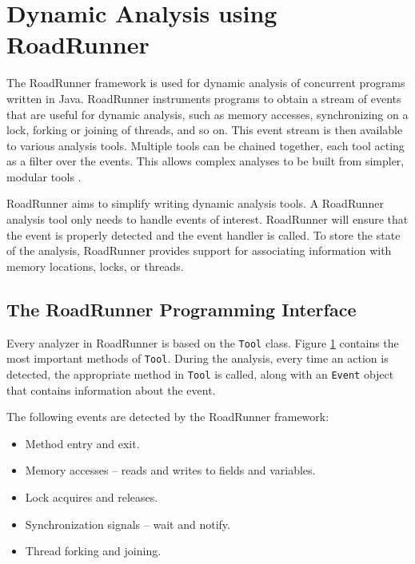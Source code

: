 \section{Dynamic Analysis using RoadRunner}

The RoadRunner framework is used for dynamic analysis of concurrent programs
written in Java. RoadRunner instruments programs to obtain a stream of events
that are useful for dynamic analysis, such as memory accesses, synchronizing on
a lock, forking or joining of threads, and so on. This event stream is then
available to various analysis tools. Multiple tools can be chained together,
each tool acting as a filter over the events. This allows complex analyses to be
built from simpler, modular tools \cite{RoadRunner}.

RoadRunner aims to simplify writing dynamic analysis tools. A RoadRunner
analysis tool only needs to handle events of interest. RoadRunner will ensure
that the event is properly detected and the event handler is called. To store
the state of the analysis, RoadRunner provides support for associating
information with memory locations, locks, or threads.



\subsection{The RoadRunner Programming Interface}

Every analyzer in RoadRunner is based on the \texttt{Tool} class. Figure
\ref{toolclass} contains the most important methods of \texttt{Tool}. During the
analysis, every time an action is detected, the appropriate method in
\texttt{Tool} is called, along with an \texttt{Event} object that contains
information about the event.

\begin{figure}[hbt]
    \label{toolclass}
    \caption{}
\end{figure}

The following events are detected by the RoadRunner framework:
\begin{itemize}
    \item Method entry and exit.
    \item Memory accesses -- reads and writes to fields and variables.
    \item Lock acquires and releases.
    \item Synchronization signals -- wait and notify.
    \item Thread forking and joining.
\end{itemize}


